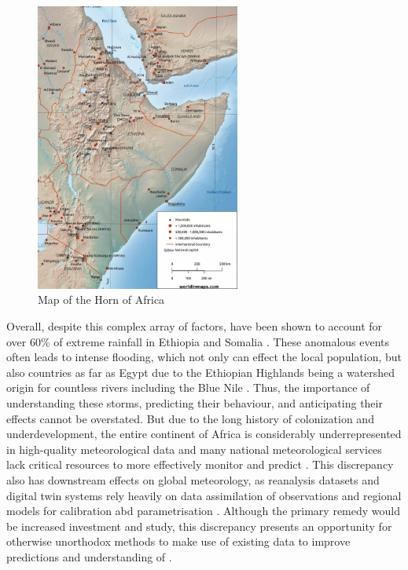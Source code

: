 \begin{figure}[h]
    \centering
    \includegraphics[width=0.6\textwidth]{../figures/static/horn-of-africa-map-scaled.jpeg}
    \caption{Map of the Horn of Africa \citep{WorldInMaps2024}}
    \label{fig:horn-of-africa}
\end{figure}

Overall, despite this complex array of factors,  have been shown to account for over 60\% of extreme rainfall in Ethiopia and Somalia \citep{Hill2023}. These anomalous events often leads to intense flooding, which not only can effect the local population, but also countries as far as Egypt due to the Ethiopian Highlands being a watershed origin for countless rivers including the Blue Nile \citep{Legese2020,Zaroug2014}. Thus, the importance of understanding these storms, predicting their behaviour, and anticipating their effects cannot be overstated. But due to the long history of colonization and underdevelopment, the entire continent of Africa is considerably underrepresented in high-quality meteorological data and many national meteorological services lack critical resources to more effectively monitor and predict  \citep{Dinku2019,Kinyondo2018,Meque2021}. This discrepancy also has downstream effects on global meteorology, as reanalysis datasets and digital twin systems rely heavily on data assimilation of observations and regional models for calibration abd parametrisation \citep{Linsenmeier2023,Valmassoi2023}. Although the primary remedy would be increased investment and study, this discrepancy presents an opportunity for otherwise unorthodox methods to make use of existing data to improve predictions and understanding of .

